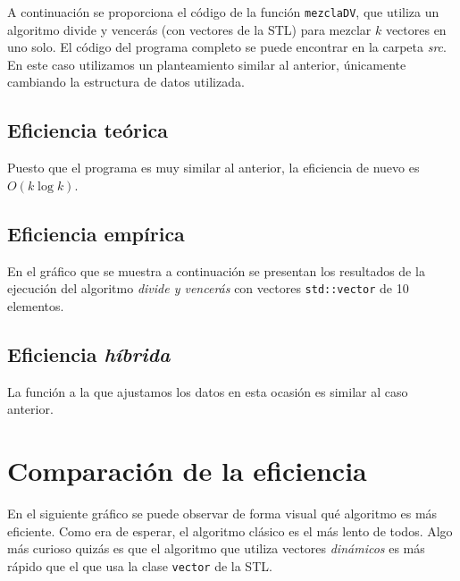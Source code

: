 \documentclass[11pt]{article}
\begin{document}
A continuación se proporciona el código de la función \texttt{mezclaDV},
que utiliza un algoritmo divide y vencerás (con vectores de la STL) para mezclar $k$ vectores en uno solo. El
código del programa completo se puede encontrar en la carpeta \textit{src}.\\
En este caso utilizamos un planteamiento similar al anterior, únicamente cambiando la estructura de datos utilizada.



\subsection*{Eficiencia teórica}

Puesto que el programa es muy similar al anterior, la eficiencia de nuevo es $O(k\log k)$.

\subsection*{Eficiencia empírica}

En el gráfico que se muestra a continuación se presentan los resultados de la
ejecución del algoritmo \textit{divide y vencerás} con vectores
\texttt{std::vector} de 10 elementos.

\begin{center}
	
\end{center}

\subsection*{Eficiencia \textit{híbrida}}
La función a la que ajustamos los datos en esta ocasión es similar al caso anterior.

\begin{center}
	
\end{center}

\section*{Comparación de la eficiencia}

En el siguiente gráfico se puede observar de forma visual qué algoritmo es más
eficiente. Como era de esperar, el algoritmo clásico es el más lento de
todos. Algo más curioso quizás es que el algoritmo que utiliza vectores
\textit{dinámicos} es más rápido que el que usa la clase \texttt{vector} de la STL.
\end{document}
